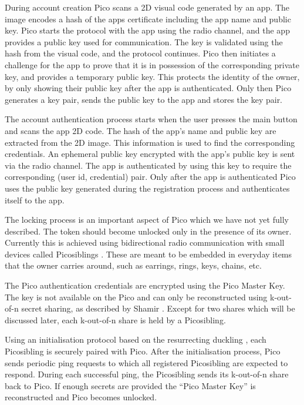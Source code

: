 During account creation Pico scans a 2D visual code generated by an app. The image encodes a hash of the apps certificate including the app name and public key. Pico starts the protocol with the app using the radio channel, and the app provides a public key used for communication. The key is validated using the hash from the visual code, and the protocol continues. Pico then initiates a challenge for the app to prove that it is in possession of the corresponding private key, and provides a temporary public key. This protects the identity of the owner, by only showing their public key after the app is authenticated. Only then Pico generates a key pair, sends the public key to the app and stores the key pair.

The account authentication process starts when the user presses the main button and scans the app 2D code. The hash of the app's name and public key are extracted from the 2D image. This information is used to find the corresponding credentials. An ephemeral public key encrypted with the app's public key is sent via the radio channel. The app is authenticated by using this key to require the corresponding (user id, credential) pair. Only after the app is authenticated Pico uses the public key generated during the registration process and authenticates itself to the app.

The locking process is an important aspect of Pico which we have not yet fully described. The token should become unlocked only in the presence of its owner. Currently this is achieved using bidirectional radio communication with small devices called Picosiblings \cite{stannard2012good}. These are meant to be embedded in everyday items that the owner carries around, such as earrings, rings, keys, chains, etc.

The Pico authentication credentials are encrypted using the Pico Master Key. The key is not available on the Pico and can only be reconstructed using k-out-of-n secret sharing, as described by Shamir \cite{shamir1979share}. Except for two shares which will be discussed later, each k-out-of-n share is held by a Picosibling. 

Using an initialisation protocol based on the resurrecting duckling \cite{stajano2000resurrecting}, each Picosibling is securely paired with Pico. After the initialisation process, Pico sends periodic ping requests to which all registered Picosibling are expected to respond. During each successful ping, the Picosibling sends its k-out-of-n share back to Pico. If enough secrets are provided the ``Pico Master Key'' is reconstructed and Pico becomes unlocked.

